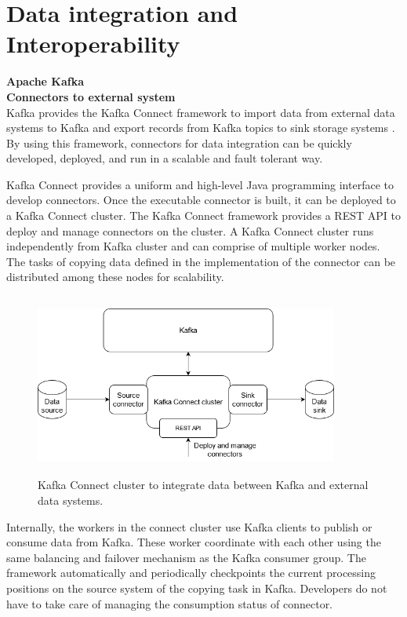 \section{Data integration and Interoperability}
\large \textbf{Apache Kafka}\\
\normalsize
\textbf{Connectors to external system}\\
Kafka provides the Kafka Connect framework to import data from external data systems to Kafka and export records from Kafka topics to sink storage systems \cite{kafkaconnect}. By using this framework, connectors for data integration can be quickly developed, deployed, and run in a scalable and fault tolerant way. 

Kafka Connect provides a uniform and high-level Java programming interface to develop connectors. Once the executable connector is built, it can be deployed to a Kafka Connect cluster. The Kafka Connect framework provides a REST API to deploy and manage connectors on the cluster. A Kafka Connect cluster runs independently from Kafka cluster and can comprise of multiple worker nodes. The tasks of copying data defined in the implementation of the connector can be distributed among these nodes for scalability. 

\begin{figure}[h]
	\centering
	\includegraphics[width=10cm,height=6cm]{images/connector-kafka.png}
	\caption{Kafka Connect cluster to integrate data between Kafka and external data systems.}
	\label{fig:connectkafka}
\end{figure}

Internally, the workers in the connect cluster use Kafka clients to publish or consume data from Kafka. These worker coordinate with each other using the same balancing and failover mechanism as the Kafka consumer group. The framework automatically and periodically checkpoints the current processing positions on the source system of the copying task in Kafka. Developers do not have to take care of managing the consumption status of connector.

